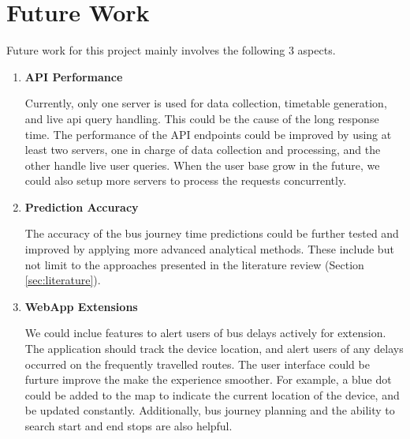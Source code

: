 \chapter{Future Work}
\par Future work for this project mainly involves the following 3 aspects.
\label{ch:future_work}
\begin{enumerate}
  \item \textbf{API Performance}
\par Currently, only one server is used for data collection, timetable generation, and live \acrshort{api} query handling. This could be the cause of the long response time. The performance of the API endpoints could be improved by using at least two servers, one in charge of data collection and processing, and the other handle live user queries. When the user base grow in the future, we could also setup more servers to process the requests concurrently.

\item \textbf{Prediction Accuracy}
\par The accuracy of the bus journey time predictions could be further tested and improved by applying more advanced analytical methods. These include but not limit to the approaches presented in the literature review (Section \ref{sec:literature}).

\item \textbf{WebApp Extensions}
\par We could inclue features to alert users of bus delays actively for extension. The application should track the device location, and alert users of any delays occurred on the frequently travelled routes. The user interface could be furture improve the make the experience smoother. For example, a blue dot could be added to the map to indicate the current location of the device, and be updated constantly. Additionally, bus journey planning and the ability to search start and end stops are also helpful.
\end{enumerate}
